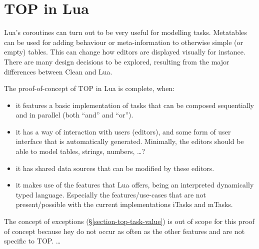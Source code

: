 \section{TOP in Lua}\label{section-top-lua}
Lua's coroutines can turn out to be very useful for modelling tasks. Metatables can be used for adding behaviour or meta-information to otherwise simple (or empty) tables. This can change how editors are displayed visually for instance. There are many design decisions to be explored, resulting from the major differences between Clean and Lua.

The proof-of-concept of TOP in Lua is complete, when:
\begin{itemize}
    \item it features a basic implementation of tasks that can be composed sequentially and in parallel (both ``and'' and ``or'').
    \item it has a way of interaction with users (editors), and some form of user interface that is automatically generated. Minimally, the editors should be able to model tables, strings, numbers, \dots?
    \item it has shared data sources that can be modified by these editors.
    \item it makes use of the features that Lua offers, being an interpreted dynamically typed language. Especially the features/use-cases that are not present/possible with the current implementations iTasks and mTasks.
\end{itemize}

The concept of exceptions (\S \ref{section-top-task-value}) is out of scope for this proof of concept because hey do not occur as often as the other features and are not specific to TOP.
\dots
